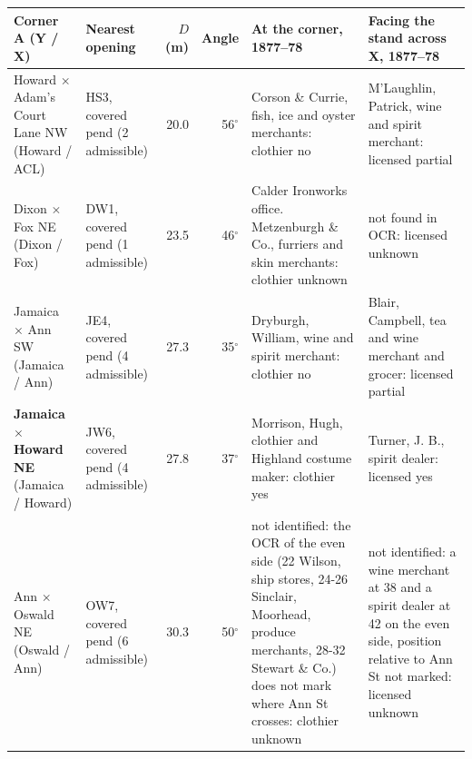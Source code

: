 \begin{tabular}{>{\raggedright\arraybackslash}p{2.7cm}>{\raggedright\arraybackslash}p{1.8cm}rr>{\raggedright\arraybackslash}p{3.9cm}>{\raggedright\arraybackslash}p{3.8cm}}
\toprule
Corner A (Y / X) & Nearest opening & $D$ (m) & Angle & At the corner, 1877--78 & Facing the stand across X, 1877--78 \\
\midrule
Howard $\times$ Adam's Court Lane NW (Howard / ACL) & HS3, covered pend (2 admissible) & 20.0 & 56$^\circ$ & Corson \& Currie, fish, ice and oyster merchants: clothier no & M'Laughlin, Patrick, wine and spirit merchant: licensed partial \\
Dixon $\times$ Fox NE (Dixon / Fox) & DW1, covered pend (1 admissible) & 23.5 & 46$^\circ$ & Calder Ironworks office. Metzenburgh \& Co., furriers and skin merchants: clothier unknown & not found in OCR: licensed unknown \\
Jamaica $\times$ Ann SW (Jamaica / Ann) & JE4, covered pend (4 admissible) & 27.3 & 35$^\circ$ & Dryburgh, William, wine and spirit merchant: clothier no & Blair, Campbell, tea and wine merchant and grocer: licensed partial \\
\textbf{Jamaica $\times$ Howard NE} (Jamaica / Howard) & JW6, covered pend (4 admissible) & 27.8 & 37$^\circ$ & Morrison, Hugh, clothier and Highland costume maker: clothier yes & Turner, J. B., spirit dealer: licensed yes \\
Ann $\times$ Oswald NE (Oswald / Ann) & OW7, covered pend (6 admissible) & 30.3 & 50$^\circ$ & not identified: the OCR of the even side (22 Wilson, ship stores, 24-26 Sinclair, Moorhead, produce merchants, 28-32 Stewart \& Co.) does not mark where Ann St crosses: clothier unknown & not identified: a wine merchant at 38 and a spirit dealer at 42 on the even side, position relative to Ann St not marked: licensed unknown \\
\bottomrule
\end{tabular}

